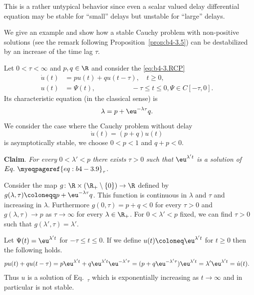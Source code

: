 This is a rather untypical behavior since even a scalar valued delay differential equation may be stable for \enquote{small} delays but unstable for \enquote{large} delays.
	
We give an example and show how a stable Cauchy problem with non-positive solutions (see the remark following Proposition~\ref{prop:b4-3.5}) can be destabilized by an increase of the time lag $\tau$.
	
Let $0 < \tau < \infty$ and $p,q \in \R$ and consider the \eqref{eq:b4-3.RCP}
\begin{equation}\label{eq:b4-3.9}
    \begin{aligned}
		\dot{u}(t) &= pu(t) + qu(t-\tau) , \quad t \geq 0 ,\\
		u(t) &= \Psi(t) , \quad\quad\quad\quad\quad\; -\tau \leq t \leq 0 , \Psi \in C[-\tau,0] .
	\end{aligned}
\end{equation}
Its characteristic equation (in the classical sense) is 
\begin{equation}\label{eq:b4-3.10}
 \lambda = p + \eu^{-\lambda\tau}q .
\end{equation}
We consider the case where the Cauchy problem without delay
\[
\dot{u}(t) = (p + q)u(t)
\]
is asymptotically stable, \ie we choose $0 < p < 1$ and $q + p < 0$.

\textbf{Claim}.
	\textit{For every} $0 < \lambda' < p$ \textit{there exists} $\tau > 0$ \textit{such that} $\eu^{\lambda't}$ \textit{is a solution of} $Eq.~\myeqpageref{eq:b4-3.9}_{\tau}$.

Consider the map $g \colon \R\times(\R_{+}\setminus\{0\}) \to \R$ defined by $g(\lambda,\tau) \coloneqq p + \eu^{-\lambda\tau}q$.
This function is continuous in $\lambda$ and $\tau$ and increasing in $\lambda$.
Furthermore $g(0,\tau) = p + q < 0$ for every $\tau > 0$ and $g(\lambda,\tau) \to p$ as $\tau \to \infty$ for every $\lambda \in \R_{+}$.
For $0 < \lambda' < p$ fixed, we can find $\tau > 0$ such that $g(\lambda',\tau) = \lambda'$.

Let $\Psi(t) = \eu^{\lambda't}$ for $-\tau \leq t \leq 0$. 
If we define $u(t) \coloneq \eu^{\lambda't}$ for $t \geq 0$ then the following holds.
\[
pu(t) + qu(t-\tau) = p\eu^{\lambda't} + q\eu^{\lambda't}\eu^{-\lambda'\tau} = (p+q\eu^{-\lambda'\tau})\eu^{\lambda't} = \lambda'\eu^{\lambda't} = \dot{u}(t) .
\]
Thus $u$ is a solution of\/ Eq.~$_{\tau}$ which is exponentially increasing as $t \to \infty$ and 
in particular is not stable.

